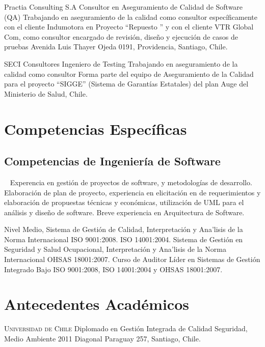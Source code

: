 \documentclass[11pt,letterpaper,roman]{moderncv}
\begin{document}
	{Practia Consulting S.A} %
	{Consultor en Aseguramiento de Calidad de Software (QA)} %
	{Trabajando en aseguramiento de la calidad como consultor}
	{específicamente con el cliente Indumotora en Proyecto  ``Repuesto '' y con el cliente
	VTR Global Com, como consultor encargado de revisión, diseño y ejecución de casos de pruebas
	}
	{Avenida Luis Thayer Ojeda 0191, Providencia, Santiago, Chile.}
	
	
	{SECI Consultores} %
	{Ingeniero de Testing} %
	{Trabajando en aseguramiento de la calidad como consultor}
	{Forma parte del equipo de Aseguramiento de la Calidad para el proyecto ``SIGGE'' (Sistema de Garantías Estatales) del plan Auge del Ministerio de Salud, Chile.
	}
	{}
	
	
\section{Competencias Espec\'ificas}
\subsection{Competencias de Ingenier\'ia de Software}\
	{Experencia en gestión de proyectos de software, y metodologías de desarrollo. 
	Elaboración de plan de proyecto, experiencia en elicitación en  de requerimientos 
	y elaboración de propuestas técnicas y económicas, utilización de UML para el análisis y diseño 
	de software. Breve experiencia en Arquitectura de Software.}
	

	{Nivel Medio, Sistema de Gestión de Calidad, Interpretación y Ana'lisis de la Norma Internacional ISO 9001:2008. ISO 14001:2004. Sistema de Gestión en Seguridad y Salud Ocupacional, Interpretación y Ana'lisis de la Norma Internacional OHSAS 18001:2007. Curso de Auditor Líder en Sistemas de Gestión Integrado Bajo ISO 9001:2008, ISO 14001:2004 y OHSAS 18001:2007.}

\section{Antecedentes Acad\'emicos}

	{\textsc{Universidad de Chile}}
	{Diplomado en Gestión Integrada de Calidad Seguridad, Medio Ambiente}
	{2011}
	{}
	{Diagonal Paraguay 257, Santiago, Chile.}
	
\end{document}
